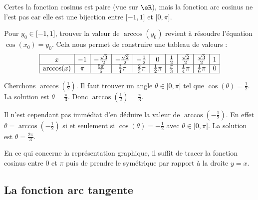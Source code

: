 \begin{remark}
    Certes la fonction cosinus est paire (vue sur \( \eR\)), mais la fonction arc cosinus ne l'est pas car elle est une bijection entre \(\mathopen[ -1 , 1 \mathclose]\) et \(\mathopen[ 0 , \pi \mathclose]\).
\end{remark}

Pour \( y_0\in\mathopen[ -1 , 1 \mathclose]\), trouver la valeur de \( \arccos(y_0)\) revient à résoudre l'équation \( \cos(x_0)=y_0\). Cela nous permet de construire une tableau de valeurs :
\begin{equation*}
    \begin{array}[]{|c|c|c|c|c|c|c|c|c|c|}
        \hline
        x&-1&-\frac{ \sqrt{3} }{2}&-\frac{ \sqrt{2} }{2}&-\frac{ 1 }{2}&0&\frac{ 1 }{2}&\frac{ \sqrt{2} }{2}&\frac{ \sqrt{3} }{2}&1\\
          \hline
          \arccos(x)&\pi&\frac{ 5\pi }{ 6 }&\frac{ 3 }{ 4 }\pi&\frac{ 2 }{ 3 }\pi&\frac{ 1 }{2}\pi&\frac{ \pi }{ 3 }&\frac{1}{ 4 }\pi&\frac{1}{ 6 }\pi&0\\
          \hline 
           \end{array}
\end{equation*}

\begin{example}
    Cherchons \( \arccos(\frac{ 1 }{2})\). Il faut trouver un angle \( \theta\in\mathopen[ 0 , \pi \mathclose]\) tel que \( \cos(\theta)=\frac{ 1 }{2}\). La solution est \( \theta=\frac{ \pi }{ 3 }\). Donc \( \arccos(\frac{ 1 }{2})=\frac{ \pi }{ 3 }\).

    Il n'est cependant pas immédiat d'en déduire la valeur de \( \arccos(-\frac{ 1 }{2})\). En effet \( \theta=\arccos(-\frac{ 1 }{2})\) si et seulement si \( \cos(\theta)=-\frac{ 1 }{2}\) avec \( \theta\in\mathopen[ 0 , \pi \mathclose]\). La solution est \( \theta=\frac{ 2\pi }{ 3 }\).
\end{example}

En ce qui concerne la représentation graphique, il suffit de tracer la fonction cosinus entre \( 0\) et \( \pi\) puis de prendre le symétrique par rapport à la droite \( y=x\).

\begin{center}
    
\end{center}

\subsection{La fonction arc tangente}

